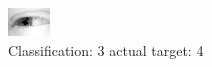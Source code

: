 \begin{figure}[h!]
\begin{center}
\includegraphics[width=0.60\columnwidth]{figures/ID2513_class_3_target_4.png}
\end{center}
\caption{ Classification: 3 actual target: 4}
\label{fig:ID2513_class_3_target_4}
\end{figure}
